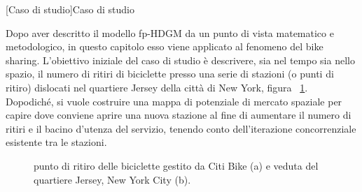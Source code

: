 [Caso di studio]{Caso di studio}

Dopo aver descritto il modello fp-HDGM da un punto di vista matematico e metodologico, in questo capitolo esso viene applicato al fenomeno del bike sharing. L'obiettivo iniziale del caso di studio è descrivere, sia nel tempo sia nello spazio, il numero di ritiri di biciclette presso una serie di stazioni (o punti di ritiro) dislocati nel quartiere Jersey della città di New York, figura ~\ref{presentazione_Jersey_City}. Dopodiché, si vuole costruire una mappa di potenziale di mercato spaziale per capire dove conviene aprire una nuova stazione al fine di aumentare il numero di ritiri e il bacino d'utenza del servizio, tenendo conto dell'iterazione concorrenziale esistente tra le stazioni.

\begin{figure}[b!]
	\centering
	\quad
	\quad
	\caption[Punto di ritiro delle biciclette e veduta del quartiere Jersey]{punto di ritiro delle biciclette gestito da Citi Bike (a) e veduta del quartiere Jersey, New York City (b).}
	\label{presentazione_Jersey_City}
\end{figure}

